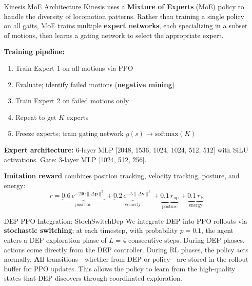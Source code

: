 \documentclass[landscape]{article}
\begin{document}
\begin{minipage}[t]{0.245\textwidth}

\begin{posterblock}{Kinesis MoE Architecture}
\fontsize{13}{16}\selectfont
Kinesis uses a \textbf{Mixture of Experts} (MoE) policy to handle the diversity of locomotion patterns. Rather than training a single policy on all gaits, MoE trains multiple \textbf{expert networks}, each specializing in a subset of motions, then learns a gating network to select the appropriate expert.

\vspace{4pt}
\textbf{Training pipeline:}
\begin{enumerate}[nosep, leftmargin=1.2em]
\item Train Expert 1 on all motions via PPO
\item Evaluate; identify failed motions (\textbf{negative mining})
\item Train Expert 2 on failed motions only
\item Repeat to get $K$ experts
\item Freeze experts; train gating network $g(s) \to \text{softmax}(K)$
\end{enumerate}

\vspace{3pt}
\textbf{Expert architecture:} 6-layer MLP [2048, 1536, 1024, 1024, 512, 512] with SiLU activations. Gate: 3-layer MLP [1024, 512, 256].

\vspace{5pt}
\textbf{Imitation reward} combines position tracking, velocity tracking, posture, and energy:
\vspace{-2pt}
\[
r = \underbrace{0.6\, e^{-200\|\Delta \mathbf{p}\|^2}}_{\text{position}} + \underbrace{0.2\, e^{-5\|\Delta \mathbf{v}\|^2}}_{\text{velocity}} + \underbrace{0.1\, r_\text{up}}_{\text{posture}} + \underbrace{0.1\, r_\text{E}}_{\text{energy}}
\]

\end{posterblock}

\begin{posterblock}{DEP-PPO Integration: StochSwitchDep}
\fontsize{13}{16}\selectfont
We integrate DEP into PPO rollouts via \textbf{stochastic switching}: at each timestep, with probability $p{=}0.1$, the agent enters a DEP exploration phase of $L{=}4$ consecutive steps. During DEP phases, actions come directly from the DEP controller. During RL phases, the policy acts normally. \textbf{All} transitions---whether from DEP or policy---are stored in the rollout buffer for PPO updates. This allows the policy to learn from the high-quality states that DEP discovers through coordinated exploration.
\end{posterblock}

\end{minipage}%
\end{document}
